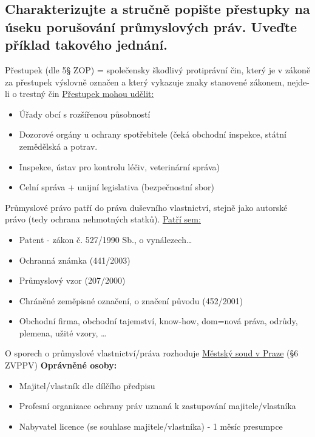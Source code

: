 \subsection{Charakterizujte a stručně popište přestupky na úseku porušování průmyslových práv. Uveďte příklad takového jednání.}
Přestupek (dle 5§ ZOP) = společensky škodlivý protiprávní čin, který je v zákoně za přestupek výslovně označen
a který vykazuje znaky stanovené zákonem, nejde-li o trestný čin
\newline\newline\underline{Přestupek mohou udělit:}
\begin{itemize}
    \item Úřady obcí s rozšířenou působností
    \item Dozorové orgány u ochrany spotřebitele (čeká obchodní inspekce, státní zemědělská a potrav.
    \item Inspekce, ústav pro kontrolu léčiv, veterinární správa)
    \item Celní správa + unijní legislativa (bezpečnostní sbor)
\end{itemize}
Průmyslové právo patří do práva duševního vlastnictví, stejně jako autorské právo (tedy ochrana nehmotných
statků).
\newline\newline\underline{Patří sem:}
\begin{itemize}
    \item Patent - zákon č. 527/1990 Sb., o vynálezech…
    \item Ochranná známka (441/2003)
    \item Průmyslový vzor (207/2000)
    \item Chráněné zeměpisné označení, o značení původu (452/2001)
    \item Obchodní firma, obchodní tajemství, know-how, dom=nová práva, odrůdy, plemena, užité vzory, …
\end{itemize}
O sporech o průmyslové vlastnictví/práva rozhoduje \underline{Městský soud v Praze} (§6 ZVPPV)
\newline\newline\textbf{Oprávněné osoby:}
\begin{itemize}
    \item Majitel/vlastník dle dílčího předpisu
    \item Profesní organizace ochrany práv uznaná k zastupování majitele/vlastníka
    \item Nabyvatel licence (se souhlase majitele/vlastníka) - 1 měsíc presumpce
\end{itemize}
